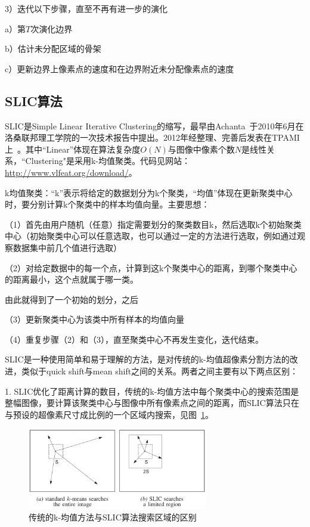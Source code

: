 \documentclass[12pt]{article}
\begin{document}
3）迭代以下步骤，直至不再有进一步的演化
 
a）第$T$次演化边界

b）估计未分配区域的骨架

c）更新边界上像素点的速度和在边界附近未分配像素点的速度

\subsection{SLIC算法}

SLIC是Simple Linear Iterative Clustering的缩写，最早由Achanta~\cite{achanta2010slic}于2010年6月在洛桑联邦理工学院的一次技术报告中提出。2012年经整理、完善后发表在TPAMI上~\cite{achanta2012slic}。其中“Linear”体现在算法复杂度$O(N)$与图像中像素个数$N$是线性关系，“Clustering"是采用k-均值聚类。代码见网站：\url{http://www.vlfeat.org/download/}。

k均值聚类：“k”表示将给定的数据划分为k个聚类，“均值”体现在更新聚类中心时，要分别计算k个聚类中的样本均值向量。主要思想：

（1）首先由用户随机（任意）指定需要划分的聚类数目k，然后选取k个初始聚类中心（初始聚类中心可以任意选取，也可以通过一定的方法进行选取，例如通过观察数据集中前几个值进行选取）

（2）对给定数据中的每一个点，计算到这k个聚类中心的距离，到哪个聚类中心的距离最小，这个点就属于哪一类。

由此就得到了一个初始的划分，之后

（3）更新聚类中心为该类中所有样本的均值向量

（4）重复步骤（2）和（3），直至聚类中心不再发生变化，迭代结束。

SLIC是一种使用简单和易于理解的方法，是对传统的k-均值超像素分割方法的改进，类似于quick shift与mean shift之间的关系。两者之间主要有以下两点区别：

1. SLIC优化了距离计算的数目，传统的k-均值方法中每个聚类中心的搜索范围是整幅图像，要计算该聚类中心与图像中所有像素点之间的距离，而SLIC算法只在与预设的超像素尺寸成比例的一个区域内搜索，见图~\ref{fig: searchregion}。

\begin{figure}[!ht]
\centering
\includegraphics[width=0.7\textwidth]{searchregion.png}
\caption{传统的k-均值方法与SLIC算法搜索区域的区别}
\label{fig: searchregion}
\end{figure} 
\end{document}
